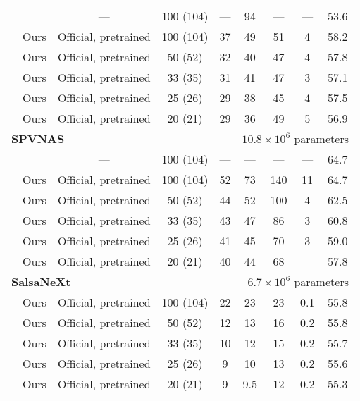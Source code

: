 \documentclass[runningheads]{tpls/llncs}
\begin{document}
\begin{table*}[t]
\begin{tabular*}{\textwidth}{@{}l@{\extracolsep{\fill}}*{8}{c}@{}}
        & \cite{Zhang_2020_CVPR} & --- & 100 (104) & --- & 94 & --- & --- & 53.6 \\ 
        & Ours    & Official, pretrained & 100 (104) & 37 & 49 & 51 & 4 & 58.2 \\ 
        & Ours    & Official, pretrained & 50 (52)   & 32 & 40 & 47 & 4 & 57.8  \\
        & Ours    & Official, pretrained & 33 (35)   & 31 & 41 & 47 & 3 & 57.1 \\ 
        & Ours    & Official, pretrained & 25 (26)   & 29 & 38 & 45 & 4 & 57.5 \\ 
        & Ours    & Official, pretrained & 20 (21)   & 29 & 36 & 49 & 5 & 56.9 \\ 
        \midrule
        \multicolumn{4}{l}{\textbf{SPVNAS~\cite{tang2020searching}}} & & \multicolumn{4}{r}{\scriptsize $10.8\times 10^6$ parameters} \\
              & \cite{tang2020searching} & --- & 100 (104) & --- & --- & --- & --- & 64.7  \\
         & Ours    & Official, pretrained & 100 (104) & 52 & 73 & 140 & 11 & 64.7  \\
         & Ours    & Official, pretrained & 50 (52)   & 44 & 52 & 100 & 4 & 62.5  \\
         & Ours    & Official, pretrained & 33 (35)   & 43 & 47 & 86  & 3 & 60.8  \\
         & Ours    & Official, pretrained & 25 (26)   & 41 & 45 & 70 & 3 & 59.0  \\
         & Ours    & Official, pretrained & 20 (21)   & 40 & 44 & 68  &  & 57.8  \\
        \midrule
        \multicolumn{4}{l}{\textbf{SalsaNeXt~\cite{cortinhal2020salsanext}}} & & \multicolumn{4}{r}{\scriptsize $6.7\times 10^6$ parameters} \\
         & Ours    & Official, pretrained & 100 (104) & 22 & 23 & 23 & 0.1 & 55.8  \\
         & Ours    & Official, pretrained & 50 (52)   & 12 & 13 & 16 & 0.2 & 55.8  \\
         & Ours    & Official, pretrained & 33 (35)   & 10 & 12 & 15 & 0.2 & 55.7  \\
         & Ours    & Official, pretrained & 25 (26)   & 9  & 10 & 13 & 0.2 & 55.6  \\
         & Ours    & Official, pretrained & 20 (21)   & 9  & 9.5 & 12 & 0.2 & 55.3 \\
        \bottomrule
    \end{tabular*}
\end{table*} 
\end{document}
